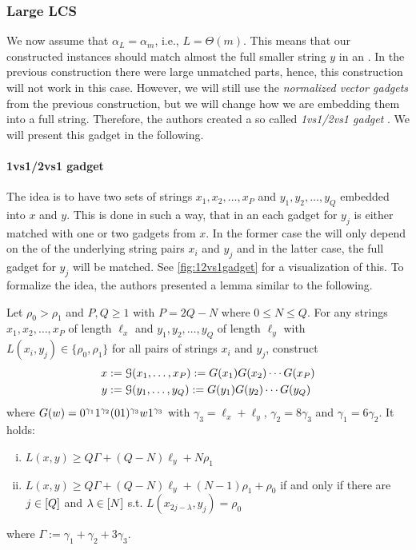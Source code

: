 \subsubsection{Large LCS}

We now assume that $\alpha_L = \alpha_m$, i.e., $L = \Theta(m)$.
This means that our constructed instances should match almost the full smaller string $y$ in an \lcs{}.
In the previous construction there were large unmatched parts, hence, this construction will not work in this case.
However, we will still use the \emph{normalized vector gadgets} from the previous construction, but we will change how we are embedding them into a full string.
Therefore, the authors created a so called \emph{1vs1/2vs1 gadget} \cite[section 9.2.1]{Bringman.2018}.
We will present this gadget in the following.

\paragraph{1vs1/2vs1 gadget}
The idea is to have two sets of strings $x_1, x_2, \ldots, x_P$ and $y_1, y_2, \ldots, y_Q$ embedded into $x$ and $y$.
This is done in such a way, that in an \lcs{} each gadget for $y_j$ is either matched with one or two gadgets from $x$.
In the former case the \lcs{} will only depend on the \lcs{} of the underlying string pairs $x_i$ and $y_j$ and in the latter case, the full gadget for $y_j$ will be matched.
See \autoref{fig:12vs1gadget} for a visualization of this.
To formalize the idea, the authors presented a lemma \cite[Lemma 9.6]{Bringman.2018} similar to the following.






\begin{lemma}
Let $\rho_0 > \rho_1$ and $P, Q \geq 1$ with $P = 2Q - N$ where $0 \leq N \leq Q$.
For any strings $x_1, x_2, \ldots, x_P$ of length $\ell_x$ and $y_1, y_2, \ldots, y_Q$ of length $\ell_y$ with $L(x_i, y_j) \in \{\rho_0, \rho_1\}$ for all pairs of strings $x_i$ and $y_j$, construct
\begin{align*}
	x &:= \mathcal{G}(x_1, \ldots, x_P) := G(x_1)G(x_2) \cdots G(x_P)\\
	y &:= \mathcal{G}(y_1, \ldots, y_Q) := G(y_1)G(y_2) \cdots G(y_Q)
\end{align*}
where $G(w) = 0^{\gamma_1}1^{\gamma_2}(01)^{\gamma_3}w1^{\gamma_3}$ with $\gamma_3 = \ell_x + \ell_y$, $\gamma_2 = 8\gamma_3$ and $\gamma_1 = 6\gamma_2$.
It holds:

\begin{enumerate}[(i)]
\item\label{lem:1-2vs1gadget-1} $L(x,y) \geq Q\Gamma + (Q-N)\ell_y + N\rho_1$
\item\label{lem:1-2vs1gadget-2} $L(x,y) \geq Q\Gamma + (Q-N)\ell_y + (N-1)\rho_1 + \rho_0$ if and only if there are $j \in [Q]$ and $\lambda \in [N]$ s.t. $L(x_{2j-\lambda}, y_j) = \rho_0$
\end{enumerate}
%
where $\Gamma := \gamma_1 + \gamma_2 + 3\gamma_3$.

\end{lemma}

